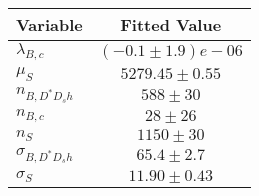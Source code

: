 \begin{tabular}[t]{lc}
\hline
Variable &Fitted Value\\
\hline\hline
$\lambda_{B,c}$&$(-0.1\pm1.9)e-06$\\
\hline
$\mu_S$&$5279.45\pm0.55$\\
\hline
$n_{B, D^* D_s h}$&$588\pm30$\\
\hline
$n_{B,c}$&$28\pm26$\\
\hline
$n_S$&$1150\pm30$\\
\hline
$\sigma_{B, D^* D_s h}$&$65.4\pm2.7$\\
\hline
$\sigma_S$&$11.90\pm0.43$\\
\hline
\end{tabular}